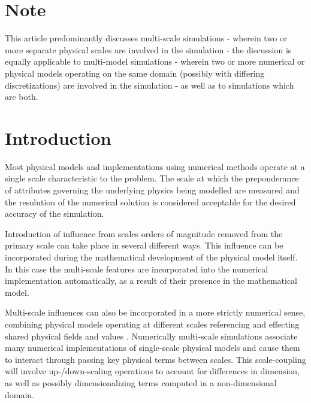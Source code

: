 \documentclass[11pt]{siamltex1213}
\begin{document}
\maketitle

\begin{abstract}
\end{abstract}

\section{Note}\label{note}
This article predominantly discusses multi-scale simulations - wherein two or more separate physical scales are involved in the simulation - the discussion is equally applicable to multi-model simulations - wherein two or more numerical or physical models operating on the same domain (possibly with differing discretizations) are involved in the simulation - as well as to simulations which are both.

\section{Introduction}\label{introduction}
\label{single_scale_simulations}
Most physical models and implementations using numerical methods operate at a single scale characteristic to the problem. The scale at which the preponderance of attributes governing the underlying physics being modelled are measured and the resolution of the numerical solution is considered acceptable for the desired accuracy of the simulation.

\label{multi_scale_simulations}
Introduction of influence from scales orders of magnitude removed from the primary scale can take place in several different ways. This influence can be incorporated during the mathematical development of the physical model itself. In this case the multi-scale features are incorporated into the numerical implementation automatically, as a result of their presence in the mathematical model. 

Multi-scale influences can also be incorporated in a more strictly numerical sense, combining physical models operating at different scales referencing and effecting shared physical fields and values \cite{shenoy97} \cite{weinan2003heterogenous}. Numerically multi-scale simulations associate many numerical implementations of single-scale physical models and cause them to interact through passing key physical terms between scales. This scale-coupling will involve up-/down-scaling operations to account for differences in dimension, as well as possibly dimensionalizing terms computed in a non-dimensional domain.
\end{document}
